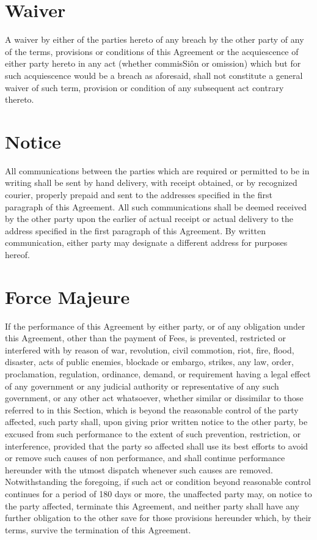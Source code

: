 \documentclass[letterpaper,10pt,english]{sphinxmanual}
\begin{document}
\section{Waiver}
\label{\detokenize{miscellaneous:waiver}}
A waiver by either of the parties hereto of any breach by the other party of any of the terms, provisions or conditions of this Agreement or the acquiescence of either party hereto in any act (whether commisSiôn or omission) which but for such acquiescence would be a breach as aforesaid, shall not constitute a general waiver of such term, provision or condition of any subsequent act contrary thereto.


\section{Notice}
\label{\detokenize{miscellaneous:notice}}
All communications between the parties which are required or permitted to be in writing shall be sent by hand delivery, with receipt obtained, or by recognized courier, properly prepaid and sent to the addresses specified in the first paragraph of this Agreement. All such communications shall be deemed received by the other party upon the earlier of actual receipt or actual delivery to the address specified in the first paragraph of this Agreement. By written communication, either party may designate a different address for purposes hereof.


\section{Force Majeure}
\label{\detokenize{miscellaneous:force-majeure}}
If the performance of this Agreement by either party, or of any obligation under this Agreement, other than the payment of Fees, is prevented, restricted or interfered with by reason of war, revolution, civil commotion, riot, fire, flood, disaster, acts of public enemies, blockade or embargo, strikes, any law, order, proclamation, regulation, ordinance, demand, or requirement having a legal effect of any government or any judicial authority or representative of any such government, or any other act whatsoever, whether similar or dissimilar to those referred to in this Section, which is beyond the reasonable control of the party affected, such party shall, upon giving prior written notice to the other party, be excused from such performance to the extent of such prevention, restriction, or interference, provided that the party so affected shall use its best efforts to avoid or remove such causes of non performance, and shall continue performance hereunder with the utmost dispatch whenever such causes are removed. Notwithstanding the foregoing, if such act or condition beyond reasonable control continues for a period of 180 days or more, the unaffected party may, on notice to the party affected, terminate this Agreement, and neither party shall have any further obligation to the other save for those provisions hereunder which, by their terms, survive the termination of this Agreement.
\end{document}
